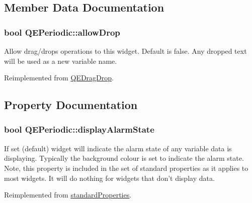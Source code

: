 \subsection{Member Data Documentation}
\hypertarget{classQEPeriodic_aa97a78df2c379a27e3462d52d0e1ea93}{
\subsubsection[{allowDrop}]{\setlength{\rightskip}{0pt plus 5cm}bool {\bf QEPeriodic::allowDrop}}}
\label{classQEPeriodic_aa97a78df2c379a27e3462d52d0e1ea93}
Allow drag/drops operations to this widget. Default is false. Any dropped text will be used as a new variable name. 

Reimplemented from \hyperlink{classQEDragDrop}{QEDragDrop}.



\subsection{Property Documentation}
\hypertarget{classQEPeriodic_aa60b7e5faa9103d2b7df5bff9bf442f2}{
\subsubsection[{displayAlarmState}]{\setlength{\rightskip}{0pt plus 5cm}bool QEPeriodic::displayAlarmState}}
\label{classQEPeriodic_aa60b7e5faa9103d2b7df5bff9bf442f2}
If set (default) widget will indicate the alarm state of any variable data is displaying. Typically the background colour is set to indicate the alarm state. Note, this property is included in the set of standard properties as it applies to most widgets. It will do nothing for widgets that don't display data. 

Reimplemented from \hyperlink{classstandardProperties}{standardProperties}.

